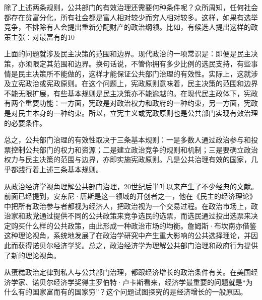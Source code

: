 除了上述两条规则，公共部门的有效治理还需要何种条件呢？众所周知，任何社会都存在贫富分化，所有社会都是富人相对较少而穷人相对较多。这样，如果有选举竞争，不排除有人会提出重新分配财产的政治纲领。比如，有候选人提出这样的政策主张：对最富有的10%

上面的问题就涉及民主决策的范围和边界。现代政治的一项常识是：即便是民主决策，亦须限定其范围和边界。换句话说，不管你拥有多少比例的选民支持，有些事情是民主决策所不能做的，这样才能保证公共部门治理的有效性。实际上，这就涉及立宪政治或宪政原则。在这个问题上，宪政原则意味着，民主决策的范围和边界不能无限扩展，有些基本规则是民主决策亦不能逾越的。在现代民主政体下，宪政有两个重要功能：一方面，宪政是对政治权力和政府的一种约束，另一方面，宪政是对民主本身的一种约束。所以，立宪主义或宪政原则也是公共部门实现有效治理的必要条件。

总之，公共部门治理的有效性取决于三条基本规则：一是多数人通过政治参与和投票控制公共部门的权力和资源；二是建立政治竞争的规则和机制；三是要确立政治权力与民主决策的范围与边界，亦即实施宪政原则。凡是公共治理有效的国家，几乎都践行着上述三条基本规则。

从政治经济学视角理解公共部门治理，20世纪后半叶以来产生了不少经典的文献。前面已经提到，安东尼·唐斯是这一领域的开创者之一，他在《民主的经济理论》中把所有政治参与者都视为经济人，把政治视为一个交易过程。在政治市场上，政治家和政党通过提供不同的公共政策来竞争选民的选票，而选民通过投出选票来决定购买什么样的公共政策，由此形成一种政治市场的均衡。詹姆斯·布坎南亦借鉴这种理论视角，系统地发展了在政治学研究中产生重大影响的公共选择理论，并因此而获得诺贝尔经济学奖。总之，政治经济学为理解公共部门治理和政府行为提供了新的理论视角。


从蛋糕政治定律到私人与公共部门治理，都跟经济增长的政治条件有关。在美国经济学家、诺贝尔经济学奖得主罗伯特·卢卡斯看来，经济学最重要的问题就是“为什么有的国家富而有的国家穷”？这个问题试图探究的是经济增长的一般原因。

